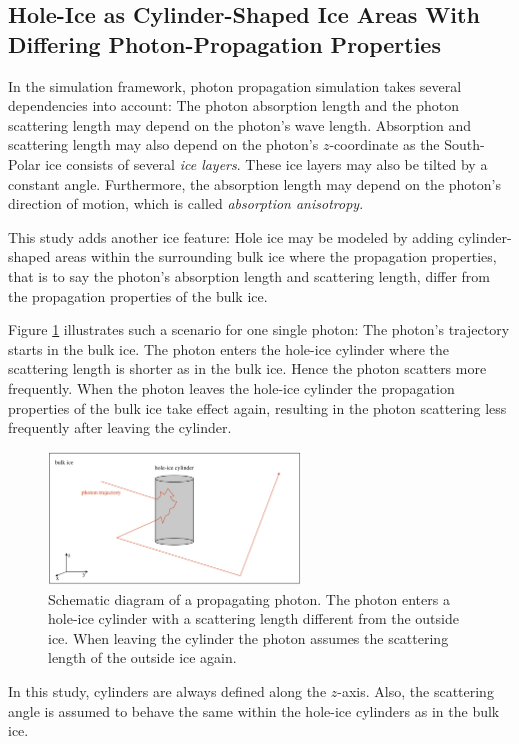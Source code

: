 
\subsection{Hole-Ice as Cylinder-Shaped Ice Areas With Differing Photon-Propagation Properties}

In the \icecube simulation framework, photon propagation simulation takes several dependencies into account: The photon absorption length and the photon scattering length may depend on the photon's wave length. Absorption and scattering length may also depend on the photon's $z$-coordinate as the South-Polar ice consists of several \textit{ice layers}. These ice layers may also be tilted by a constant angle. Furthermore, the absorption length may depend on the photon's direction of motion, which is called \textit{absorption anisotropy}.

This study adds another ice feature: Hole ice may be modeled by adding cylinder-shaped areas within the surrounding bulk ice where the propagation properties, that is to say the photon's absorption length and scattering length, differ from the propagation properties of the bulk ice.

Figure \ref{fig:aiw2Thah} illustrates such a scenario for one single photon: The photon's trajectory starts in the bulk ice. The photon enters the hole-ice cylinder where the scattering length is shorter as in the bulk ice. Hence the photon scatters more frequently. When the photon leaves the hole-ice cylinder the propagation properties of the bulk ice take effect again, resulting in the photon scattering less frequently after leaving the cylinder.

\begin{figure}[htb]
  \centering
  \includegraphics[width=0.6\textwidth]{img/hole-ice-as-cylinder-shaped-areas}
  \caption{Schematic diagram of a propagating photon. The photon enters a hole-ice cylinder with a scattering length different from the outside ice. When leaving the cylinder the photon assumes the scattering length of the outside ice again.}
  \label{fig:aiw2Thah}
\end{figure}

In this study, cylinders are always defined along the $z$-axis. Also, the scattering angle is assumed to behave the same within the hole-ice cylinders as in the bulk ice.


